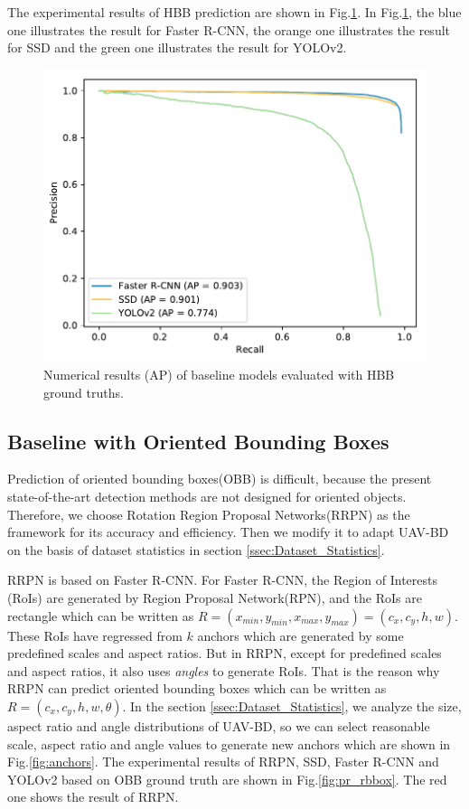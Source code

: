 The experimental results of HBB prediction are shown in Fig.\ref{fig:pr_bbox}. In Fig.\ref{fig:pr_bbox}, the blue one illustrates the result for Faster R-CNN, the orange one illustrates the result for SSD and the green one illustrates the result for YOLOv2.


\begin{figure}
	\includegraphics[width=\linewidth]{images/pr_bbox.pdf}
	\caption{Numerical results (AP) of baseline models evaluated with HBB ground truths.}
	\label{fig:pr_bbox}
\end{figure}

\subsection{Baseline with Oriented Bounding Boxes}

Prediction of oriented bounding boxes(OBB) is difficult, because the present state-of-the-art detection methods are not designed for oriented objects. Therefore, we choose Rotation Region Proposal Networks(RRPN)\cite{RRPN} as the framework for its accuracy and efficiency. Then we modify it to adapt UAV-BD on the basis of dataset statistics in section \ref{ssec:Dataset_Statistics}.

RRPN is based on Faster R-CNN. For Faster R-CNN, the Region of Interests (RoIs) are generated by Region Proposal Network(RPN), and the RoIs are rectangle which can be written as $ R = (x_{min}, y_{min}, x_{max}, y_{max}) = (c_x, c_y, h, w) $. These RoIs have regressed from $ k $ anchors which are generated by some predefined scales and aspect ratios. But in RRPN, except for predefined scales and aspect ratios, it also uses \textit{angles} to generate RoIs. That is the reason why RRPN can predict oriented bounding boxes which can be written as $ R=(c_x, c_y, h, w, \theta) $. In the section \ref{ssec:Dataset_Statistics}, we analyze the size, aspect ratio and angle distributions of UAV-BD, so we can select reasonable scale, aspect ratio and angle values to generate new anchors which are shown in Fig.\ref{fig:anchors}. The experimental results of RRPN, SSD, Faster R-CNN and YOLOv2 based on OBB ground truth are shown in Fig.\ref{fig:pr_rbbox}. The red one shows the result of RRPN.



